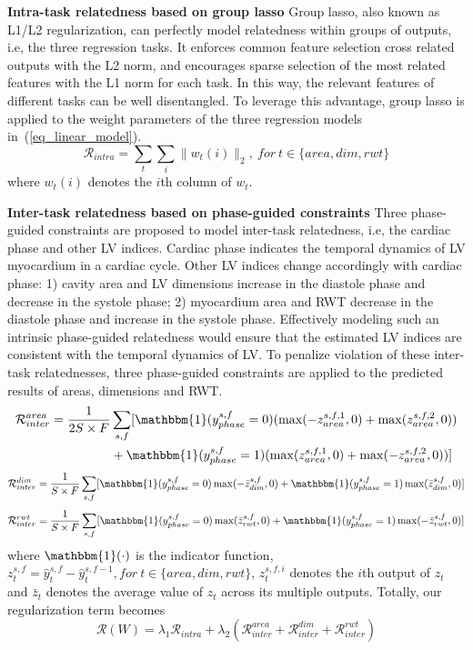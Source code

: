 \documentclass{llncs}
\begin{document}
\textbf{Intra-task relatedness based on group lasso}
Group lasso, also known as L1/L2 regularization, can perfectly model relatedness within groups of outputs, i.e, the three regression tasks. It enforces common feature selection cross related outputs with the L2 norm, and encourages sparse selection of the most related features with the L1 norm for each task. In this way, the relevant features of different tasks can be well disentangled. To leverage this advantage, group lasso is applied to the weight parameters of the three regression models in~(\ref{eq_linear_model}). 
\begin{equation}
\mathcal{R}_{intra}=\sum_t \sum_i\|w_t(i)\|_2, ~for ~t\in\{area, dim, rwt\}
\end{equation}
where $w_t(i)$ denotes the $i$th column of $w_t$. 
 
\textbf{Inter-task relatedness based on phase-guided constraints}
Three phase-guided constraints are proposed to model inter-task relatedness, i.e, the cardiac phase and other LV indices. Cardiac phase indicates the temporal dynamics of LV myocardium in a cardiac cycle. Other LV indices change accordingly with cardiac phase: 1) cavity area and LV dimensions increase in the diastole phase and decrease in the systole phase; 2) myocardium area and RWT decrease in the diastole phase and increase in the systole phase. Effectively modeling such an intrinsic phase-guided relatedness would ensure that the estimated LV indices are consistent with the temporal dynamics of LV. 
To penalize violation of these inter-task relatednesses, three phase-guided constraints are applied to the predicted results of areas, dimensions and RWT.
\begin{equation}
\begin{split}
\mathcal{R}_{inter}^{area}=\frac{1}{2S\times F}&\sum_{s,f}[\mathbbm{1}(y_{phase}^{s,f}=0)(\max(-z_{area}^{s,f,1},0)+\max(z_{area}^{s,f,2},0))\\
&+\mathbbm{1}(y_{phase}^{s,f}=1)(\max(z_{area}^{s,f,1},0)+\max(-z_{area}^{s,f,2},0))]
\end{split}
\end{equation}
\begin{equation}
\mathcal{R}_{inter}^{dim}=\frac{1}{S\times F}\sum_{s,f}[\mathbbm{1}(y_{phase}^{s,f}=0)\max(-\bar{z}_{dim}^{s,f},0)+ \mathbbm{1}(y_{phase}^{s,f}=1)\max(\bar{z}_{dim}^{s,f},0)]
\end{equation}
\begin{equation}
\mathcal{R}_{inter}^{rwt}=\frac{1}{S\times F}\sum_{s,f}[\mathbbm{1}(y_{phase}^{s,f}=0)\max(\bar{z}_{rwt}^{s,f},0)+ \mathbbm{1}(y_{phase}^{s,f}=1)\max(-\bar{z}_{rwt}^{s,f},0)]
\end{equation}
where $\mathbbm{1}(\cdot)$ is the indicator function, $z_t^{s,f}=\hat{y}_t^{s,f}-\hat{y}_t^{s,f-1}, for~t\in\{area,dim,rwt\}$, $z_t^{s,f,i}$ denotes the $i$th output of $z_t$ and $\bar{z}_t$ denotes the average value of $z_t$ across its multiple outputs. Totally, our regularization term becomes
\begin{equation}
\mathcal{R}(W)=\lambda_1\mathcal{R}_{intra}+\lambda_2(\mathcal{R}_{inter}^{area}+\mathcal{R}_{inter}^{dim}+\mathcal{R}_{inter}^{rwt})
\end{equation}
\end{document}

